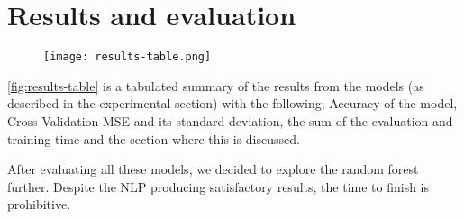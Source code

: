 \section{Results and evaluation}
\begin{figure}[h]
  \centering
  \texttt{[image: results-table.png]}
  \caption{}
  \label{fig:results-table}
\end{figure}

\autoref{fig:results-table} is a tabulated summary of the results from the models (as described in the experimental section) with the following; Accuracy of the model, Cross-Validation MSE and its standard deviation, the sum of the evaluation and training time and the section where this is discussed.

After evaluating all these models, we decided to explore the random forest further. Despite the NLP producing satisfactory results, the time to finish is prohibitive.
